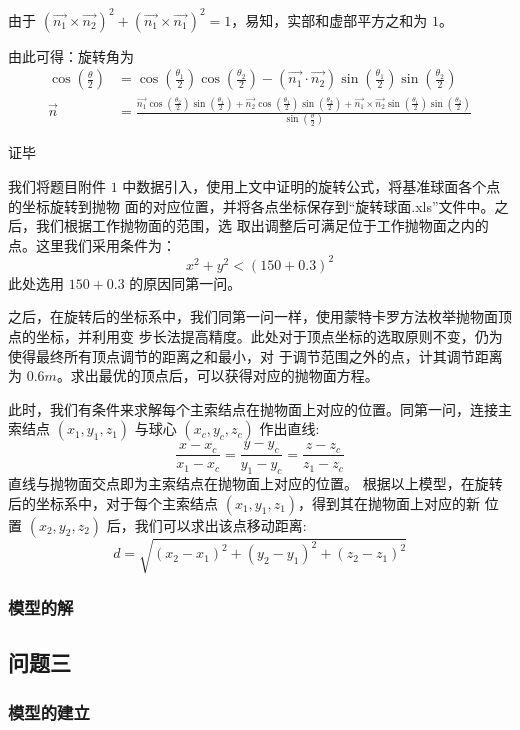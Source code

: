\documentclass[withoutpreface,bwprint]{cumcmthesis} %
\begin{document}
由于 $(\overrightarrow{n_1} \times \overrightarrow{n_2})^2 + (\overrightarrow{n_1} 
\times \overrightarrow{n_1})^2 = 1$，易知，实部和虚部平方之和为 $1$。

由此可得：旋转角为
\[
    \begin{split}
        \cos(\frac{\theta}{2}) &= \cos(\frac{\theta _1}{2})
        \cos(\frac{\theta _2}{2}) - (\overrightarrow{n_1} \cdot 
        \overrightarrow{n_2})\sin(\frac{\theta _1}{2})
        \sin(\frac{\theta _2}{2}) \\
        \overrightarrow{n} &= \frac{\displaystyle \overrightarrow{n_1}
        \cos(\frac{\theta _2}{2})\sin(\frac{\theta _1}{2}) + 
        \overrightarrow{n_2}\cos(\frac{\theta _1}{2})
        \sin(\frac{\theta _2}{2}) + \overrightarrow{n_1} \times 
        \overrightarrow{n_2}\sin(\frac{\theta _1}{2})
        \sin(\frac{\theta _2}{2})}
        {\displaystyle \sin(\frac{\theta}{2})} 
    \end{split}
\]\par
证毕

我们将题目附件 $1$ 中数据引入，使用上文中证明的旋转公式，将基准球面各个点的坐标旋转到抛物
面的对应位置，并将各点坐标保存到“旋转球面.xls”文件中。之后，我们根据工作抛物面的范围，选
取出调整后可满足位于工作抛物面之内的点。这里我们采用条件为：
\[
    x^2+y^2<(150+0.3)^2
\]
此处选用 $150+0.3$ 的原因同第一问。

之后，在旋转后的坐标系中，我们同第一问一样，使用蒙特卡罗方法枚举抛物面顶点的坐标，并利用变
步长法提高精度。此处对于顶点坐标的选取原则不变，仍为使得最终所有顶点调节的距离之和最小，对
于调节范围之外的点，计其调节距离为 $0.6m$。求出最优的顶点后，可以获得对应的抛物面方程。

此时，我们有条件来求解每个主索结点在抛物面上对应的位置。同第一问，连接主索结点 $(x_1,y_1,z_1)$
与球心 $(x_c,y_c,z_c)$ 作出直线:
\[
    \frac{x-x_c}{x_1-x_c}=\frac{y-y_c}{y_1-y_c}=\frac{z-z_c}{z_1-z_c}
\]
直线与抛物面交点即为主索结点在抛物面上对应的位置。
根据以上模型，在旋转后的坐标系中，对于每个主索结点 $(x_1,y_1,z_1)$，得到其在抛物面上对应的新
位置 $(x_2,y_2,z_2)$ 后，我们可以求出该点移动距离:
\[
    d = \sqrt{(x_2-x_1)^2+(y_2-y_1)^2+(z_2-z_1)^2}
\]
\subsubsection{模型的解}
\subsection{问题三}
\subsubsection{模型的建立}
\end{document}

